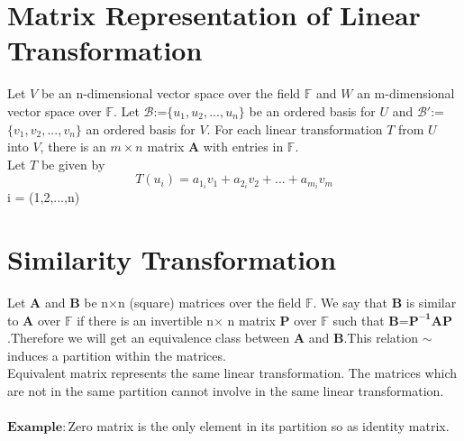 \documentclass[12pt]{article}
\theoremstyle{definition}
\begin{document}
	\section{Matrix Representation of Linear Transformation}
	 Let $V$ be an n-dimensional vector space over the field $ \mathbb{F}$ and $W$ an m-dimensional vector space over $\mathbb{F}$. Let $\mathcal{B}$:=$\{u_1,u_2,...,u_n\}$ be an ordered basis for $U$ and $\mathcal{B\prime}$:=$\{v_1,v_2,...,v_n\}$ an ordered basis for $V$. For each linear transformation $T$ from $U$ into $V$, there is an $ m\times n$ matrix $\mathbf{A}$ with entries in $\mathbb{F}$.\\
	 Let $T$ be given by
 	 $$ T(u_{i})=a_{1_{i}}v_1+a_{2_{i}}v_2+...+a_{m_{i}}v_m $$
	  i = (1,2,...,n)\\
	  
	  \section{Similarity Transformation}
	  Let $\mathbf{A}$ and $\mathbf{B}$ be n$\times$n (square) matrices over the field $\mathbb{F}$. We say that $\mathbf{B}$ is similar to $\mathbf{A}$ over $\mathbb{F}$ if there is an invertible n$\times$ n matrix $\mathbf{P}$ over $\mathbb{F}$ such that  $\mathbf{B}$=$\mathbf{P^{-1}}\mathbf{A}\mathbf{P}$.Therefore we will get an equivalence class between $\mathbf{A}$ and $\mathbf{B}$.This relation $\sim$ induces a partition within the matrices.\\
	  Equivalent matrix represents the same linear transformation. The matrices which are not in the same partition cannot involve in the same linear transformation.\\
	  \\
	  $\mathbf{Example:}$Zero matrix is the only element in its partition so as identity matrix.
\end{document}
